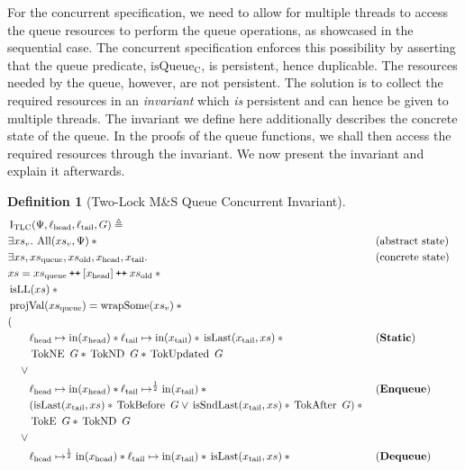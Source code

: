 \documentclass[a4paper, 10pt]{report}
\theoremstyle{definition}
\newtheorem{definition}{Definition}[section]
\newcommand{\msq}{M\&S Queue}
\newcommand{\tlmsq}{Two-Lock \msq{}}
\newcommand{\isqueueconc}{\operatorname{isQueue_{C}}}
\newcommand{\TLQueueInvariantConc}{\operatorname{I_{TLC}}}
\newcommand{\xsc}{xs}
\newcommand{\xsqueue}{xs_{\mathrm{queue}}}
\newcommand{\xsold}{xs_{\mathrm{old}}}
\newcommand{\isLL}{\operatorname{isLL}}
\newcommand{\AllP}{\operatorname{All}}
\newcommand{\projval}{\operatorname{projVal}}
\newcommand{\wrapsome}{\operatorname{wrapSome}}
\newcommand{\isLast}{\operatorname{isLast}}
\newcommand{\isSndLast}{\operatorname{isSndLast}}
\newcommand{\locN}[1]{\loc_{\mathrm{#1}}}
\newcommand{\lochead}{\locN{head}}
\newcommand{\loctail}{\locN{tail}}
\newcommand{\nIn}[1]{\operatorname{in}(#1)}
\newcommand{\node}{x}
\newcommand{\nodeN}[1]{\node_{\mathrm{#1}}}
\newcommand{\nodehead}{\nodeN{head}}
\newcommand{\nodetail}{\nodeN{tail}}
\newcommand{\absvalueList}{xs_v}
\newcommand{\StaticState}{\textbf{Static}\xspace}
\newcommand{\EnqueueState}{\textbf{Enqueue}\xspace}
\newcommand{\DequeueState}{\textbf{Dequeue}\xspace}
\newcommand{\Qg}{G}
\newcommand{\TokE}[1]{\operatorname{TokE} ~ #1}
\newcommand{\TokEQg}{\TokE{\Qg}}
\newcommand{\TokNE}[1]{\operatorname{TokNE} ~ #1}
\newcommand{\TokNEQg}{\TokNE{\Qg}}
\newcommand{\TokND}[1]{\operatorname{TokND} ~ #1}
\newcommand{\TokNDQg}{\TokND{\Qg}}
\newcommand{\TokBefore}[1]{\operatorname{TokBefore} ~ #1}
\newcommand{\TokBeforeQg}{\TokBefore{\Qg}}
\newcommand{\TokAfter}[1]{\operatorname{TokAfter} ~ #1}
\newcommand{\TokAfterQg}{\TokAfter{\Qg}}
\newcommand{\TokUpdated}[1]{\operatorname{TokUpdated} ~ #1}
\newcommand{\TokUpdatedQg}{\TokUpdated{\Qg}}
\newcommand\catenate{\mathbin{\text{\ttfamily\upshape ++}}}
\begin{document}
For the concurrent specification, we need to allow for multiple threads to access the queue resources to perform the queue operations, as showcased in the sequential case. The concurrent specification enforces this possibility by asserting that the queue predicate, $\isqueueconc$, is persistent, hence duplicable. The resources needed by the queue, however, are not persistent. The solution is to collect the required resources in an \textit{invariant} which \emph{is} persistent and can hence be given to multiple threads. The invariant we define here additionally describes the concrete state of the queue. In the proofs of the queue functions, we shall then access the required resources through the invariant. We now present the invariant and explain it afterwards.
\begin{definition}[\tlmsq{} Concurrent Invariant]\label{TLMSQ:spec:conc:invariant}
  \begin{align*}
    &\TLQueueInvariantConc(\Psi, \lochead, \loctail, \Qg) \eqdef\\
    &\Exists \absvalueList. \AllP(\absvalueList, \Psi) \star{} &&\text{(abstract state)}\\
    &\Exists \xsc, \xsqueue, \xsold, \nodehead, \nodetail . &&\text{(concrete state)}\\
    &\xsc = \xsqueue \catenate [\nodehead] \catenate \xsold \star{}\\
    &\isLL(\xsc) \star{}\\
    &\projval(\xsqueue) = \wrapsome(\absvalueList) \star{}\\
    &(\\
    &\quad\quad\lochead \mapsto \nIn{\nodehead} \star{} \loctail \mapsto \nIn{\nodetail} \star{} \isLast(\nodetail, \xsc) \star{} &&\text{(\StaticState)}\\
    &\quad\quad \TokNEQg \star{} \TokNDQg \star{} \TokUpdatedQg\\
    &\quad\lor{}\\
    &\quad\quad\lochead \mapsto \nIn{\nodehead} \star{} \loctail \mapsto^{\frac{1}{2}} \nIn{\nodetail} \star{} &&\text{(\EnqueueState)}\\
    &\quad\quad (\isLast(\nodetail, \xsc) \star{} \TokBeforeQg \lor{} \isSndLast(\nodetail, \xsc) \star{} \TokAfterQg) \star{}\\
    &\quad\quad \TokEQg \star{} \TokNDQg\\
    &\quad\lor{}\\
    &\quad\quad\lochead \mapsto^{\frac{1}{2}} \nIn{\nodehead} \star{} \loctail \mapsto \nIn{\nodetail} \star{} \isLast(\nodetail, \xsc) \star{} &&\text{(\DequeueState)}\\

\end{align*}
\end{definition}
\end{document}
